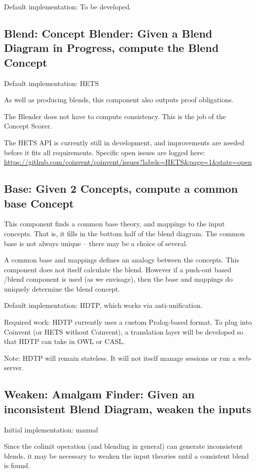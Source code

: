 \documentclass[a4paper,twoside,11pt]{article}
\begin{document}
Default implementation: To be developed.

\subsection{Blend: Concept Blender: Given a Blend Diagram in Progress, compute the Blend Concept}

Default implementation: HETS

As well as producing blends, this component also outputs proof obligations.

The Blender does not have to compute consistency. This is the job of the Concept Scorer.

The HETS API is currently still in development, and improvements are needed
before it fits all requirements. Specific open issues are logged here: \url{https://github.com/coinvent/coinvent/issues?labels=HETS&page=1&state=open}

\subsection{Base: Given 2 Concepts, compute a common base Concept}

This component finds a common base theory, and mappings to the input concepts. That is,
it fills in the bottom half of the blend diagram. 
The common base is not always unique -- there may be a choice of several.

A common base and mappings defines an analogy between the concepts. This component does not itself calculate the blend. However if a push-out based /blend component is used (as we envisage), then the base and mappings do uniquely determine the blend concept.

Default implementation: HDTP, which works via anti-unification.

Required work: HDTP currently uses a custom Prolog-based format. To plug into Coinvent (or HETS without Coinvent), a translation layer will be developed so that HDTP can take in OWL or CASL.

Note: HDTP will remain stateless. It will not itself manage sessions or run a web-server.
\subsection{Weaken: Amalgam Finder: Given an inconsistent Blend Diagram, weaken the inputs}


Initial implementation: manual

Since the colimit operation (and blending in general) can generate inconsistent blends, it may be necessary to weaken the input theories until a consistent blend is found. 
\end{document}
